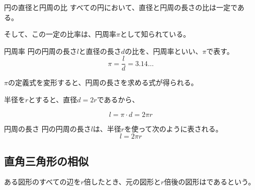 \documentclass[../../math-imaging]{subfiles}
\begin{document}
\begin{theorem}{円の直径と円周の比}
  すべての円において、直径と円周の長さの比は一定である。
\end{theorem}

そして、この一定の比率は、円周率$\pi$として知られている。

\begin{definition}{円周率}
  円の円周の長さ$l$と直径の長さ$d$の比を、円周率といい、$\pi$で表す。
  \LARGE
  \begin{equation}
    \pi = \dfrac{l}{d} = 3.14\ldots
  \end{equation}
\end{definition}

$\pi$の定義式を変形すると、円周の長さを求める式が得られる。

半径を$r$とすると、直径$d = 2r$であるから、

\begin{equation}
  l = \pi \cdot d = 2\pi r
\end{equation}

\begin{theorem}{円周の長さ}
  円の円周の長さ$l$は、半径$r$を使って次のように表される。
  \LARGE
  \begin{equation}
    l = 2\pi r
  \end{equation}
\end{theorem}

\subsection{直角三角形の相似}

ある図形のすべての辺を$r$倍したとき、元の図形と$r$倍後の図形はであるという。
\end{document}
